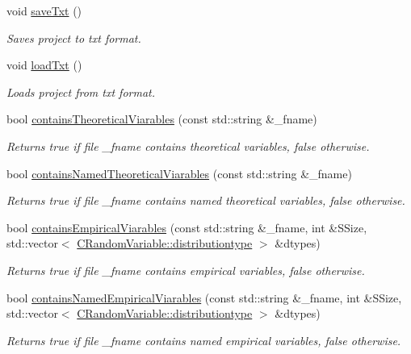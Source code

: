 \begin{DoxyCompactItemize}
void \hyperlink{class_go_s_u_m_1_1_c_container_ac3bf0b71180d660aa5595839801ba6d2}{save\-Txt} ()
\begin{DoxyCompactList}\small\item\em Saves project to txt format. \end{DoxyCompactList}\item 
void \hyperlink{class_go_s_u_m_1_1_c_container_a74d77db2e9759c572e77559d2d3140e2}{load\-Txt} ()
\begin{DoxyCompactList}\small\item\em Loads project from txt format. \end{DoxyCompactList}\item 
bool \hyperlink{class_go_s_u_m_1_1_c_container_abe0ee6f577828f361df4db93d7fd1424}{contains\-Theoretical\-Viarables} (const std\-::string \&\-\_\-fname)
\begin{DoxyCompactList}\small\item\em Returns true if file \-\_\-fname contains theoretical variables, false otherwise. \end{DoxyCompactList}\item 
bool \hyperlink{class_go_s_u_m_1_1_c_container_a3a732e1369789b610f82b388b09d452e}{contains\-Named\-Theoretical\-Viarables} (const std\-::string \&\-\_\-fname)
\begin{DoxyCompactList}\small\item\em Returns true if file \-\_\-fname contains named theoretical variables, false otherwise. \end{DoxyCompactList}\item 
bool \hyperlink{class_go_s_u_m_1_1_c_container_a14f14de868517eeb457601f98ffd0fc5}{contains\-Empirical\-Viarables} (const std\-::string \&\-\_\-fname, int \&S\-Size, std\-::vector$<$ \hyperlink{class_c_random_variable_a80d2a87c43847274138b51f7d713d7f1}{C\-Random\-Variable\-::distributiontype} $>$ \&dtypes)
\begin{DoxyCompactList}\small\item\em Returns true if file \-\_\-fname contains empirical variables, false otherwise. \end{DoxyCompactList}\item 
bool \hyperlink{class_go_s_u_m_1_1_c_container_a445cedd0b8f00ccb5520eb726dcff53d}{contains\-Named\-Empirical\-Viarables} (const std\-::string \&\-\_\-fname, int \&S\-Size, std\-::vector$<$ \hyperlink{class_c_random_variable_a80d2a87c43847274138b51f7d713d7f1}{C\-Random\-Variable\-::distributiontype} $>$ \&dtypes)
\begin{DoxyCompactList}\small\item\em Returns true if file \-\_\-fname contains named empirical variables, false otherwise. \end{DoxyCompactList}\item 

\end{DoxyCompactItemize}
